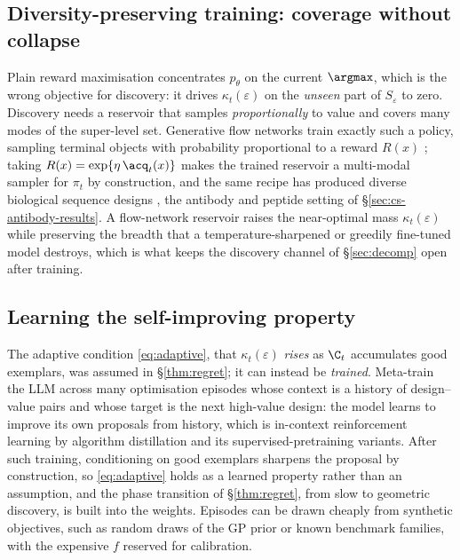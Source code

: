 \subsection{Diversity-preserving training: coverage without collapse}
\label{sec:gflownet}
Plain reward maximisation concentrates $p_\theta$ on the current $\argmax$, which is the wrong objective for
discovery: it drives $\kappa_t(\varepsilon)$ on the \emph{unseen} part of $S_\varepsilon$ to zero. Discovery
needs a reservoir that samples \emph{proportionally} to value and covers many modes of the super-level set.
Generative flow networks train exactly such a policy, sampling terminal objects with probability proportional
to a reward $R(x)$ \citep{bengio2021flow}; taking $R(x)=\exp\{\eta\,\acq_t(x)\}$ makes the trained reservoir a
multi-modal sampler for $\pi_t$ by construction, and the same recipe has produced diverse biological sequence
designs \citep{jain2022biological}, the antibody and peptide setting of \S\ref{sec:cs-antibody-results}. A
flow-network reservoir raises the near-optimal mass $\kappa_t(\varepsilon)$ while preserving the breadth that a
temperature-sharpened or greedily fine-tuned model destroys, which is what keeps the discovery channel of
\S\ref{sec:decomp} open after training.

\subsection{Learning the self-improving property}
\label{sec:metatrain}
The adaptive condition \eqref{eq:adaptive}, that $\kappa_t(\varepsilon)$ \emph{rises} as $\C_t$ accumulates
good exemplars, was assumed in \S\ref{thm:regret}; it can instead be \emph{trained}. Meta-train the
LLM across many optimisation episodes whose context is a history of design--value pairs and whose target is the
next high-value design: the model learns to improve its own proposals from history, which is in-context
reinforcement learning by algorithm distillation \citep{laskin2022context} and its supervised-pretraining
variants. After such training, conditioning on good exemplars sharpens the proposal by construction, so
\eqref{eq:adaptive} holds as a learned property rather than an assumption, and the phase transition of
\S\ref{thm:regret}, from slow to geometric discovery, is built into the weights. Episodes can be drawn
cheaply from synthetic objectives, such as random draws of the GP prior or known benchmark families, with the
expensive $f$ reserved for calibration.

